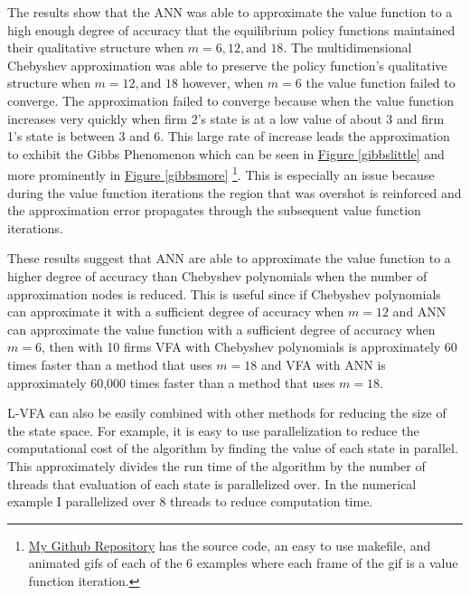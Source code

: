 \documentclass[12pt]{article}
\begin{document}
The results show that the ANN was able to approximate the value function to a high enough degree of accuracy that the equilibrium policy functions maintained their qualitative structure when $m=6,12,\text{and }18$. The multidimensional Chebyshev approximation was able to preserve the policy function's qualitative structure when $m=12, \text{and } 18$ however, when $m=6$ the value function failed to converge. The approximation failed to converge because when the value function increases very quickly when firm 2's state is at a low value of about 3 and firm 1's state is between 3 and 6. This large rate of increase leads the approximation to exhibit the Gibbs Phenomenon which can be seen in \hyperref[gibbslittle]{Figure \ref{gibbslittle}} and more prominently in  \hyperref[gibbsmore]{Figure \ref{gibbsmore}} \footnote{\href{https://github.com/wmjones/VFA-for-dynamic-games}{My Github Repository} has the source code, an easy to use makefile, and animated gifs of each of the 6 examples where each frame of the gif is a value function iteration.}. This is especially an issue because during the value function iterations the region that was overshot is reinforced and the approximation error propagates through the subsequent value function iterations.

These results suggest that ANN are able to approximate the value function to a higher degree of accuracy than Chebyshev polynomials when the number of approximation nodes is reduced. This is useful since if Chebyshev polynomials can approximate it with a sufficient degree of accuracy when $m=12$ and ANN can approximate the value function with a sufficient degree of accuracy when $m=6$, then with 10 firms VFA with Chebyshev polynomials is approximately 60 times faster than a method that uses $m=18$ and VFA with ANN is approximately 60,000 times faster than a method that uses $m=18$.

L-VFA can also be easily combined with other methods for reducing the size of the state space. For example, it is easy to use parallelization to reduce the computational cost of the algorithm by finding the value of each state in parallel. This approximately divides the run time of the algorithm by the number of threads that evaluation of each state is parallelized over. In the numerical example I parallelized over 8 threads to reduce computation time.
\end{document}
